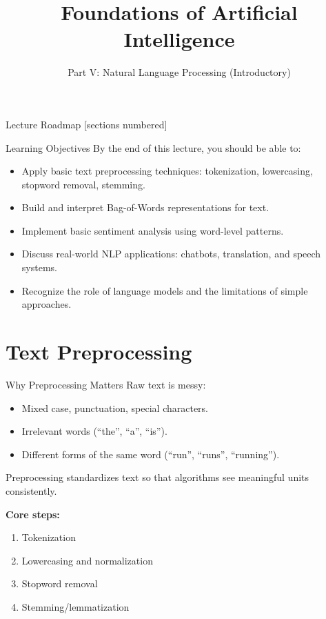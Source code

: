 \documentclass[10pt]{beamer}
\title{Foundations of Artificial Intelligence}
\subtitle{Part V: Natural Language Processing (Introductory)}
\institute{Department of Computer Science}
\date{}
\begin{document}
\maketitle

\begin{frame}{Lecture Roadmap}
    [sections numbered]
    \tableofcontents[hideallsubsections]
\end{frame}

\begin{frame}{Learning Objectives}
    By the end of this lecture, you should be able to:
    \begin{itemize}
        \item Apply basic text preprocessing techniques: tokenization, lowercasing, stopword removal, stemming.
        \item Build and interpret Bag-of-Words representations for text.
        \item Implement basic sentiment analysis using word-level patterns.
        \item Discuss real-world NLP applications: chatbots, translation, and speech systems.
        \item Recognize the role of language models and the limitations of simple approaches.
    \end{itemize}
\end{frame}

\section{Text Preprocessing}

\begin{frame}{Why Preprocessing Matters}
    Raw text is messy:
    \begin{itemize}
        \item Mixed case, punctuation, special characters.
        \item Irrelevant words (``the'', ``a'', ``is'').
        \item Different forms of the same word (``run'', ``runs'', ``running'').
    \end{itemize}
    \vspace{0.2cm}
    Preprocessing standardizes text so that algorithms see meaningful units consistently.

    \vspace{0.2cm}
    \textbf{Core steps:}
    \begin{enumerate}
        \item Tokenization
        \item Lowercasing and normalization
        \item Stopword removal
        \item Stemming/lemmatization
    \end{enumerate}
\end{frame}
\end{document}
